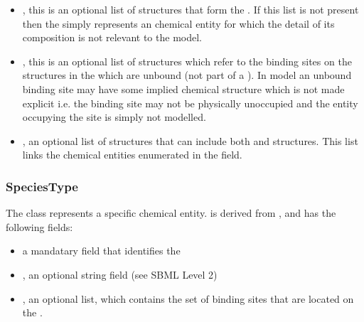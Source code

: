 \documentclass{cekarticle}
\begin{document}
\begin{itemize}

\item {}, this is an optional list of 
structures that form the .  If this list is not present
then the  simply represents an chemical entity for which the detail
of its composition is not relevant to the model.

\item {}, this is an optional list of  structures which
refer to the binding sites on the  structures in the 
which are unbound (not part of a ).  In model an unbound binding site may have
some implied chemical structure which is not made explicit i.e. the binding site may not be physically
unoccupied and the entity occupying the site is simply not modelled.

\item {}, an optional list of  structures that can include both
 and  structures.
This list links the chemical entities 
enumerated in the  field.

\end{itemize}

\subsubsection{SpeciesType}

The class  represents a specific
chemical entity.   is derived from , and has the following fields:

\begin{itemize}

\item {} a mandatary  field that identifies the 

\item {}, an optional string field (see SBML Level 2)

\item {}, an optional  list, which contains the set of binding
sites that are located on the .

\end{itemize} 
\end{document}
